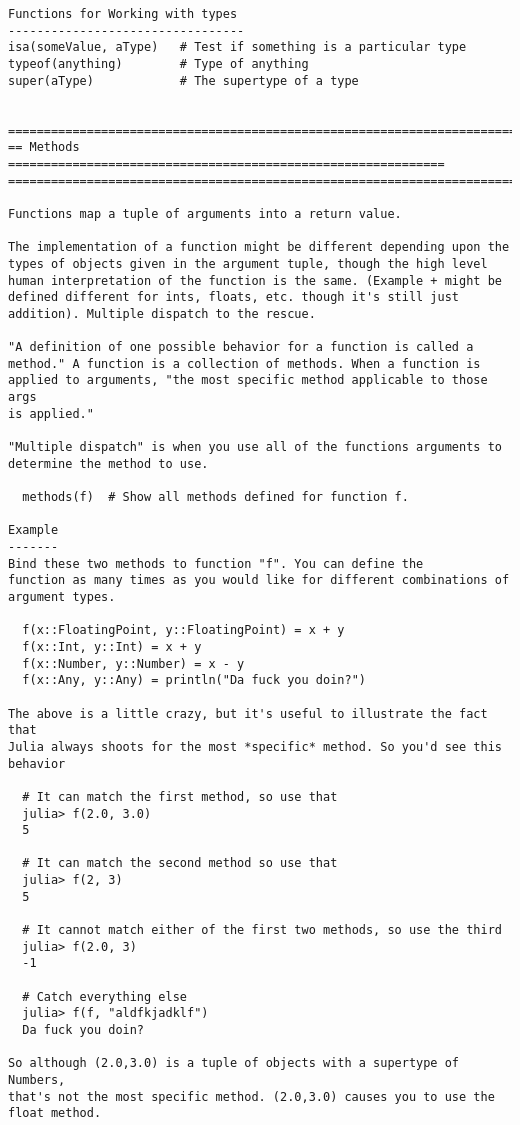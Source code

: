 \documentclass[12pt]{article}
\theoremstyle{plain}
\theoremstyle{definition}
\theoremstyle{remark}
\begin{document}
\begin{lstlisting}
Functions for Working with types
---------------------------------
isa(someValue, aType)   # Test if something is a particular type
typeof(anything)        # Type of anything
super(aType)            # The supertype of a type


========================================================================
== Methods =============================================================
========================================================================

Functions map a tuple of arguments into a return value.

The implementation of a function might be different depending upon the
types of objects given in the argument tuple, though the high level
human interpretation of the function is the same. (Example + might be
defined different for ints, floats, etc. though it's still just
addition). Multiple dispatch to the rescue.

"A definition of one possible behavior for a function is called a
method." A function is a collection of methods. When a function is
applied to arguments, "the most specific method applicable to those args
is applied."

"Multiple dispatch" is when you use all of the functions arguments to
determine the method to use.

  methods(f)  # Show all methods defined for function f.

Example
-------
Bind these two methods to function "f". You can define the
function as many times as you would like for different combinations of
argument types.

  f(x::FloatingPoint, y::FloatingPoint) = x + y
  f(x::Int, y::Int) = x + y
  f(x::Number, y::Number) = x - y
  f(x::Any, y::Any) = println("Da fuck you doin?")

The above is a little crazy, but it's useful to illustrate the fact that
Julia always shoots for the most *specific* method. So you'd see this
behavior

  # It can match the first method, so use that
  julia> f(2.0, 3.0)
  5

  # It can match the second method so use that
  julia> f(2, 3)
  5

  # It cannot match either of the first two methods, so use the third
  julia> f(2.0, 3)
  -1

  # Catch everything else
  julia> f(f, "aldfkjadklf")
  Da fuck you doin?

So although (2.0,3.0) is a tuple of objects with a supertype of Numbers,
that's not the most specific method. (2.0,3.0) causes you to use the
float method.



\end{lstlisting}
\end{document}
